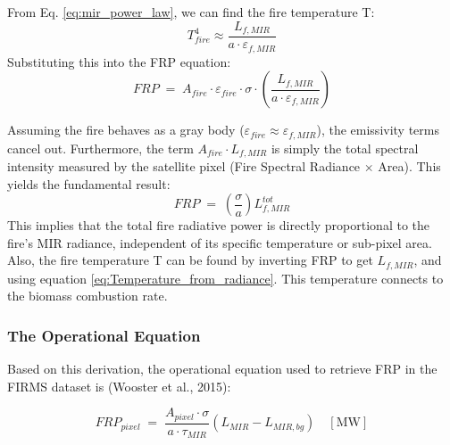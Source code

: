 From Eq. \ref{eq:mir_power_law},  we can find the fire temperature T:
\begin{equation}
T_{fire}^4 \approx \frac{L_{f,MIR}}{a \cdot \varepsilon_{f,MIR}}
\label{eq:Temperature_from_radiance}
\end{equation}
Substituting this into the FRP equation:
\begin{equation}
    FRP \;=\; A_{fire} \cdot \varepsilon_{fire} \cdot \sigma \cdot \left( \frac{L_{f,MIR}}{a \cdot \varepsilon_{f,MIR}} \right)
\end{equation}

Assuming the fire behaves as a gray body ($\varepsilon_{fire} \approx \varepsilon_{f,MIR}$), the emissivity terms cancel out. Furthermore, the term $A_{fire} \cdot L_{f,MIR}$ is simply the total spectral intensity measured by the satellite pixel (Fire Spectral Radiance $\times$ Area). This yields the fundamental result:
\begin{equation}
    FRP \;=\; \left( \frac{\sigma}{a} \right) L_{f,MIR}^{tot}
\end{equation}
This implies that the total fire radiative power is directly proportional to the fire's MIR radiance, independent of its specific temperature or sub-pixel area. Also, the fire temperature T can be found by inverting FRP to get $L_{f,MIR}$, and using equation \ref{eq:Temperature_from_radiance}. This temperature connects to the biomass combustion rate.

\subsubsection{The Operational Equation}
Based on this derivation, the operational equation used to retrieve FRP in the FIRMS dataset is (Wooster et al., 2015)\cite{wooster_lsa_2015}:

\begin{equation}
    FRP_{pixel} \;=\; \frac{A_{pixel} \cdot \sigma}{a \cdot \tau_{MIR}} \left( L_{MIR} - L_{MIR, bg} \right) \quad [\mathrm{MW}]
    \label{eq:frp_operational}
\end{equation}

